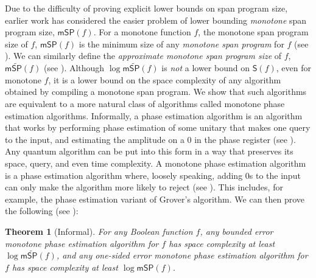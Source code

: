 \documentclass[11pt]{article}
\numberwithin{equation}{section}
\newtheorem{theorem}{Theorem}[section]
\theoremstyle{definition}
\theoremstyle{plain}
\begin{document}
Due to the difficulty of proving explicit lower bounds on span program size, earlier work has considered the easier problem of lower bounding \emph{monotone} span program size, $\mathsf{mSP}(f)$. For a monotone function $f$, the monotone span program size of $f$, $\mathsf{mSP}(f)$ is the minimum size of any \emph{monotone span program} for $f$ (see ). We can similarly define the \emph{approximate monotone span program size} of $f$, $\mathsf{m}\widetilde{\mathsf{SP}}(f)$ (see ). Although $\log\mathsf{m}\widetilde{\mathsf{SP}}(f)$ is \emph{not} a lower bound on $\mathsf{S}(f)$, even for monotone $f$, it is a lower bound on the space complexity of any algorithm obtained by compiling a monotone span program. We show that such algorithms are equivalent to a more natural class of algorithms called monotone phase estimation algorithms. Informally, a phase estimation algorithm is an algorithm that works by performing phase estimation of some unitary that makes one query to the input, and estimating the amplitude on a 0 in the phase register (see ). Any quantum algorithm can be put into this form in a way that preserves its space, query, and even time complexity. A monotone phase estimation algorithm is a phase estimation algorithm where, loosely speaking, adding 0s to the input can only make the algorithm more likely to reject (see ). This includes, for example, the phase estimation variant of Grover's algorithm. We can then prove the following (see ):
\begin{theorem}[Informal]
For any Boolean function $f$, any bounded error monotone phase estimation algorithm for $f$ has space complexity at least $\log\mathsf{m}\widetilde{\mathsf{SP}}(f)$, and any one-sided error monotone phase estimation algorithm for $f$ has space complexity at least $\log\mathsf{mSP}(f)$. 
\end{theorem}
\end{document}
